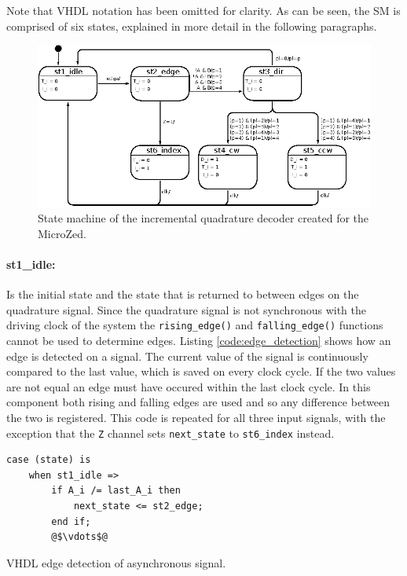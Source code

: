 Note that VHDL notation has been omitted for clarity.
As can be seen, the SM is comprised of six states, explained in more detail in the following paragraphs.
\begin{figure}[h]
	\centering
	\includegraphics[width=.85\linewidth]{graphics/quad_state_machine}
	\caption[State machine of incremental quadrature decoder.]{State machine of the incremental quadrature decoder created for the MicroZed.}
	\label{fig:quadstatemachine}
\end{figure}
\paragraph{st1\_idle:} %
Is the initial state and the state that is returned to between edges on the quadrature signal.
Since the quadrature signal is not synchronous with the driving clock of the system the \texttt{rising\_edge()} and \texttt{falling\_edge()} functions cannot be used to determine edges.
Listing \ref{code:edge_detection} shows how an edge is detected on a signal. 
The current value of the signal is continuously compared to the last value, which is saved on every clock cycle.
If the two values are not equal an edge must have occured within the last clock cycle.
In this component both rising and falling edges are used and so any difference between the two is registered.
This code is repeated for all three input signals, with the exception that the \texttt{Z} channel sets \texttt{next\_state} to \texttt{st6\_index} instead.

\begin{listing}[H]
\begin{verbatim}
case (state) is
	when st1_idle =>
		if A_i /= last_A_i then
	        next_state <= st2_edge;
	    end if;
	    @$\vdots$@
\end{verbatim}
\caption{VHDL edge detection of asynchronous signal.}
\label{code:edge_detection}
\end{listing}


